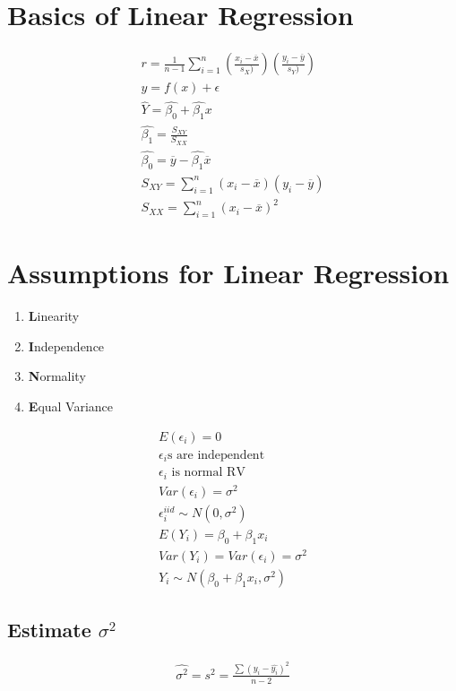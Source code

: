 \section{Basics of Linear Regression}
\begin{align}
  r = \frac{1}{n-1} \sum_{i=1}^n \left( \frac{x_i - \overbar{x}}{s_X)}  \right) \left( \frac{y_i - \overbar{y}}{s_Y)}  \right) \\
  y = f(x) + \epsilon \\
  \hat{Y} = \hat{\beta_0} + \hat{\beta_1}x \\
  \hat{\beta_1} = \frac{S_{XY}}{S_{XX}} \\
  \hat{\beta_0} = \overbar{y} - \hat{\beta_1}\overbar{x} \\
  S_{XY} = \sum_{i=1}^n (x_i - \overbar{x})(y_i - \overbar{y}) \\
  S_{XX} = \sum_{i=1}^n (x_i - \overbar{x})^2
\end{align}

\section{Assumptions for Linear Regression}
\begin{enumerate}
\item \textbf{L}inearity
\item \textbf{I}ndependence
\item \textbf{N}ormality
\item \textbf{E}qual Variance
\end{enumerate}

\begin{align}
  E(\epsilon_i) = 0 \\
  \text{$\epsilon_i$s are independent} \\
  \text{$\epsilon_i$ is normal RV} \\
  Var(\epsilon_i) = \sigma^2 \\
  \epsilon_i^{iid} \sim N(0, \sigma^2) \\
  E(Y_i) = \beta_0 + \beta_1x_i \\
  Var(Y_i) = Var(\epsilon_i) = \sigma^2 \\
  Y_i \sim N(\beta_0 + \beta_1x_i, \sigma^2)
\end{align}

\subsection{Estimate $\sigma^2$}
\begin{align}
  \hat{\sigma^2} = s^2 = \frac{\sum (y_i - \hat{y_i})^2}{n-2}
\end{align}


